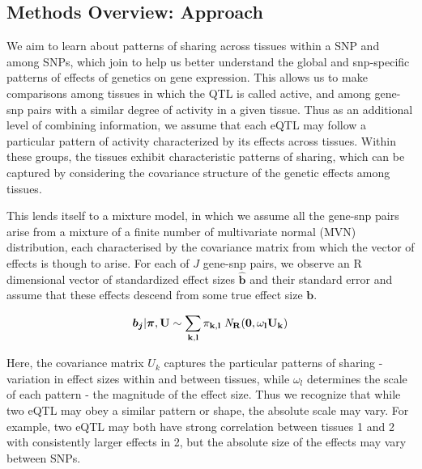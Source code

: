 \subsection{Methods Overview: Approach} 

We aim to learn about patterns of sharing across tissues within a SNP and among SNPs, which join to help us better understand the global and snp-specific patterns of effects of genetics on gene expression. 
This allows us to make comparisons among tissues in which the QTL is called active, and among gene-snp pairs with a similar degree of activity in a given tissue. 
Thus as an additional level of combining information, we assume that each eQTL may follow a particular pattern of activity characterized by its effects across tissues. Within these groups, the tissues exhibit characteristic patterns of sharing, which can be captured by considering the covariance structure of the genetic effects among tissues. 

This lends itself to a mixture model, in which  we assume all the gene-snp pairs arise from a mixture of a finite number of multivariate normal (MVN) distribution, each characterised by the covariance matrix from which the vector of effects is though to arise. For each of $J$ gene-snp pairs, we observe an R dimensional vector of standardized effect sizes $\bm\hat{b}$ and their standard error and assume that these effects descend from some true effect size $\bm{b}$. 



 \begin{equation}
  \bm{b_{j}} | \bm{\pi},\bf{U} \sim \sum_{k,l} \pi_{k,l} \;{\it N}_R(\bm{0}, \omega_l U_{k})
\end{equation}

Here, the covariance matrix $U_{k}$ captures the particular patterns of sharing - variation in effect sizes within and between tissues, while $\omega_{l}$ determines the scale of each pattern - the magnitude of the effect size. Thus we recognize that while two eQTL may obey a similar pattern or shape, the absolute scale may vary. For example, two eQTL may both have strong correlation between tissues 1 and 2 with consistently larger effects in 2, but the absolute size of the effects may vary between SNPs.\newline


